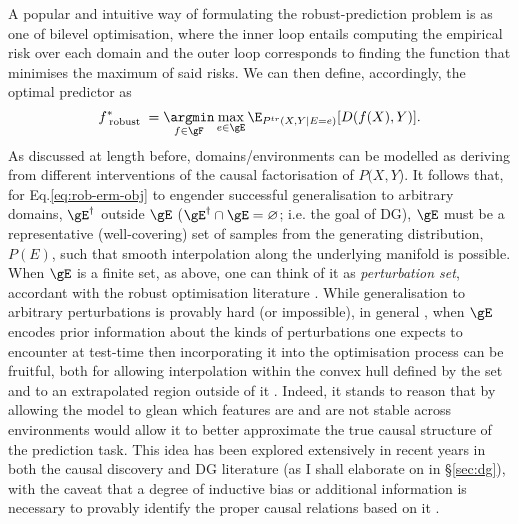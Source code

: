A popular \citep{arjovsky2019invariant, krueger2021out, sagawa2019distributionally} and intuitive way
of formulating the robust-prediction problem is as one of bilevel optimisation, where the inner
loop entails computing the empirical risk over each domain and the outer loop corresponds to
finding the function that minimises the maximum of said risks.
%
We can then define, accordingly, the optimal predictor as 
%
\begin{equation}\label{eq:rob-erm-obj} 
    f^\ast_\text{ robust } =
    \underset{ f \in \gF }{ \argmin }\, 
    \underset{ e \in \gE}{ \mathrm{max} }\,
    \E_{ P^{tr}( X, Y | E = e ) } [ D ( f( X ), Y ) ]. 
\end{equation}
%
As discussed at length before, domains/environments can be modelled as deriving from different
interventions of the causal factorisation of \(P(X, Y\)).
%
It follows that, for Eq.\ref{eq:rob-erm-obj} to engender successful generalisation to arbitrary
domains, \(\gE^\dagger\) outside \(\gE\) (\( \gE^\dagger \cap \gE = \varnothing \); i.e. the goal
of \ac{DG}), \(\gE\) must be a representative (well-covering) set of samples from the generating
distribution, \( P(E) \), such that smooth interpolation along the underlying manifold is possible.
%
When \(\gE\) is a finite set, as above, one can think of it as \emph{perturbation set},
accordant with the robust optimisation literature \citep{ben2009robust}.
%
While generalisation to arbitrary perturbations is provably hard (or impossible), in general
\citep{david2010impossibility}, when \(\gE\) encodes prior information about the kinds of
perturbations one expects to encounter at test-time then incorporating it into the optimisation
process can be fruitful, both for allowing interpolation within the convex hull defined by the
set and to an extrapolated region outside of it \citep{krueger2021out}.
%
Indeed, it stands to reason that by allowing the model to glean which features are and are not
stable across environments would allow it to better approximate the true causal structure of the
prediction task. 
%
This idea has been explored extensively in recent years in both the causal discovery
\citep{peters2016causal, bengio2019meta} and \ac{DG} \citep{arjovsky2019invariant,
ahuja2020invariant, creager2021environment} literature (as I shall elaborate on in \S\ref{sec:dg}),
with the caveat that a degree of inductive bias or additional information is necessary to provably
identify the proper causal relations based on it \citep{lin2022zin}.
%

